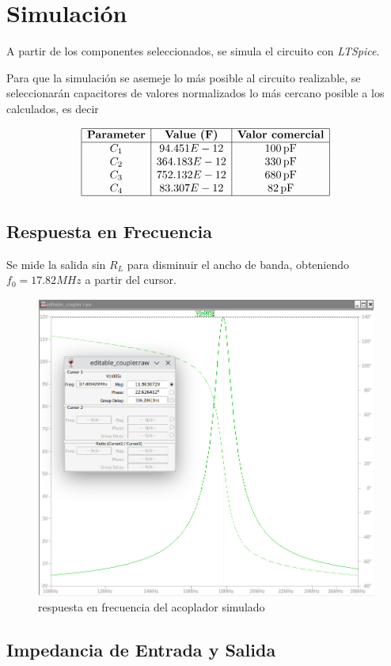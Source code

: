 \section{Simulación}
A partir de los componentes seleccionados, se simula el circuito con \textit{LTSpice}.

Para que la simulación se asemeje lo más posible al circuito realizable, se seleccionarán capacitores de valores normalizados lo más cercano posible a los calculados, es decir

\[
\begin{array}{|c|c|c|}
\hline
\textbf{Parameter} & \textbf{Value (F)} & \textbf{Valor comercial} \\
\hline
C_1 & 94.451E-12 & 100 \, \text{pF} \\
C_2 & 364.183E-12 & 330 \, \text{pF} \\
C_3 & 752.132E-12 & 680 \, \text{pF} \\
C_4 & 83.307E-12 & 82 \, \text{pF} \\
\hline
\end{array}
\]

\subsection{Respuesta en Frecuencia}

Se mide la salida sin $R_L$ para disminuir el ancho de banda, obteniendo $f_0 = 17.82 MHz$ a partir del cursor.

\begin{figure}[H]
    \centering
    \includegraphics[width=0.5\linewidth]{fig/bode.png}
    \caption{respuesta en frecuencia del acoplador simulado}
    \label{fig:enter-label}
\end{figure}

\subsection{Impedancia de Entrada y Salida}

